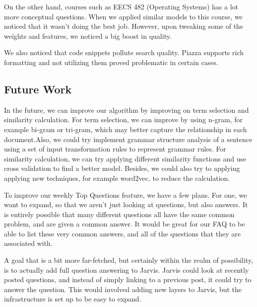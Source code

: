 \documentclass[sigconf]{acmart}
\begin{document}
On the other hand, courses such as EECS 482 (Operating Systems) has a lot more conceptual questions. When we applied similar models to this course, we noticed that it wasn't doing the best job. However, upon tweaking some of the weights and features, we noticed a big boost in quality.

We also noticed that code snippets pollute search quality. Piazza supports rich formatting and not utilizing them proved problematic in certain cases.


\subsection{Future Work}
In the future, we can improve our algorithm by improving on term selection and similarity calculation. For term selection, we can improve by using n-gram, for example bi-gram or tri-gram, which may better capture the relationship in each document.Also, we could try implement  grammar structure analysis of a sentence using a set of input transformation rules to represent grammar rules. For similarity calculation, we can try applying different similarity functions and use cross validation to find a better model. Besides, we could also try to applying applying new techniques, for example word2vec, to reduce the calculation.

To improve our weekly Top Questions feature, we have a few plans. For one, we want to expand, so that we aren't just looking at questions, but also answers. It is entirely possible that many different questions all have the same common problem, and are given a common answer. It would be great for our FAQ to be able to list these very common answers, and all of the questions that they are associated with.

A goal that is a bit more far-fetched, but certainly within the realm of possibility, is to actually add full question answering to Jarvis. Jarvis could look at recently posted questions, and instead of simply linking to a previous post, it could try to answer the question. This would involved adding new layers to Jarvis, but the infrastructure is set up to be easy to expand.



 
\end{document}
